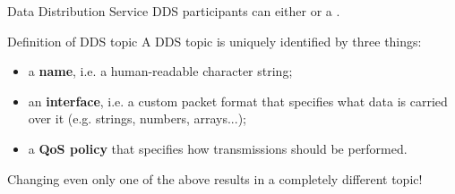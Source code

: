 \begin{frame}{Data Distribution Service}
	DDS participants can either  or  a .
	\begin{block}{Definition of DDS topic}
		A DDS topic is uniquely identified by three things:
		\begin{itemize}
			\item a \textbf{name}, i.e. a human-readable character string;
			\item an \textbf{interface}, i.e. a custom packet format that specifies what data is carried over it (e.g. strings, numbers, arrays...);
			\item a \textbf{QoS policy} that specifies how transmissions should be performed.
		\end{itemize}
	\end{block}
	\begin{block}{}
		\centering
		Changing even only one of the above results in a completely different topic!
	\end{block}
\end{frame}
